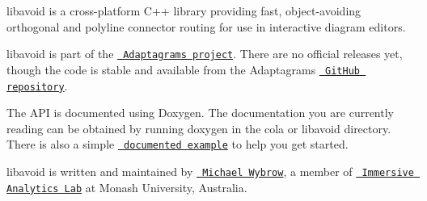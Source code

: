libavoid is a cross-\/platform C++ library providing fast, object-\/avoiding orthogonal and polyline connector routing for use in interactive diagram editors.

libavoid is part of the \href{http://www.adaptagrams.org/}{\texttt{ Adaptagrams project}}. There are no official releases yet, though the code is stable and available from the Adaptagrams \href{https://github.com/mjwybrow/adaptagrams}{\texttt{ Git\+Hub repository}}.

The API is documented using Doxygen. The documentation you are currently reading can be obtained by running doxygen in the cola or libavoid directory. There is also a simple \href{libavoid_example.html}{\texttt{ documented example}} to help you get started.

libavoid is written and maintained by \href{http://users.monash.edu/~mwybrow/}{\texttt{ Michael Wybrow}}, a member of \href{http://ialab.it.monash.edu/}{\texttt{ Immersive Analytics Lab}} at Monash University, Australia.

